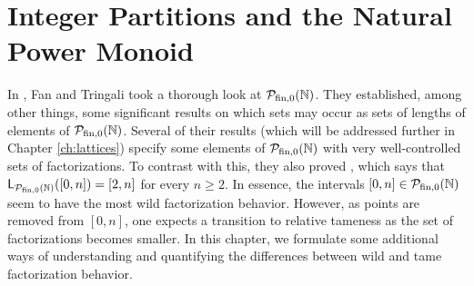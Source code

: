 \chapter{Integer Partitions and the Natural Power Monoid} \label{ch:partitions}


In \cite[Section 4]{fan-tringali18}, Fan and Tringali took a thorough look at ${\mathcal{P}_{\textrm{fin},0}(\mathbb{N})}$.
They established, among other things, some significant results on which sets may occur as sets of lengths of elements of ${\mathcal{P}_{\textrm{fin},0}(\mathbb{N})}$.  
Several of their results (which will be addressed further in Chapter \ref{ch:lattices}) specify some elements of ${\mathcal{P}_{\textrm{fin},0}(\mathbb{N})}$ with very well-controlled sets of factorizations.
To contrast with this, they also proved \cite[Proposition 4.8]{fan-tringali18}, which says that $\mathsf{L}_{\mathcal{P}_{\textrm{fin},0}(\mathbb{N})}([ 0,n ]) = [ 2,n ]$ for every $n\ge 2$.
In essence, the intervals $[ 0,n ]\in {\mathcal{P}_{\textrm{fin},0}(\mathbb{N})}$ seem to have the most wild factorization behavior.
However, as points are removed from $[ 0,n ]$, one expects a transition to relative tameness as the set of factorizations becomes smaller.
In this chapter, we formulate some additional ways of understanding and quantifying the differences between wild and tame factorization behavior.





